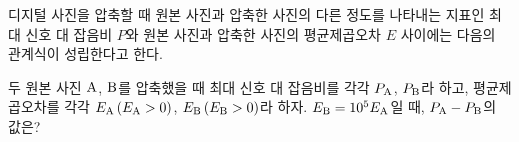 디지털 사진을 압축할 때 원본 사진과 압축한 사진의 다른 정도를 나타내는 지표인 최대 신호 대 잡음비 $P$와 원본 사진과 압축한 사진의 평균제곱오차 $E$ 사이에는 다음의 관계식이 성립한다고 한다. \par\smallskip{}\par\smallskip\noindent 두 원본 사진 $\mathrm{A}$, $\mathrm{B}$를 압축했을 때 최대 신호 대 잡음비를 각각 $P_{\mathrm{A}}$, $P_{\mathrm{B}}$라 하고, 평균제곱오차를 각각 $E_{\mathrm{A}}\mkern3mu (E_{\mathrm{A}}>0)$, $E_{\mathrm{B}}\mkern3mu (E_{\mathrm{B}}>0)$라 하자. $E_{\mathrm{B}}=10^{5}E_{\mathrm{A}}$일 때, $P_{\mathrm{A}}-P_{\mathrm{B}}$의 값은?
